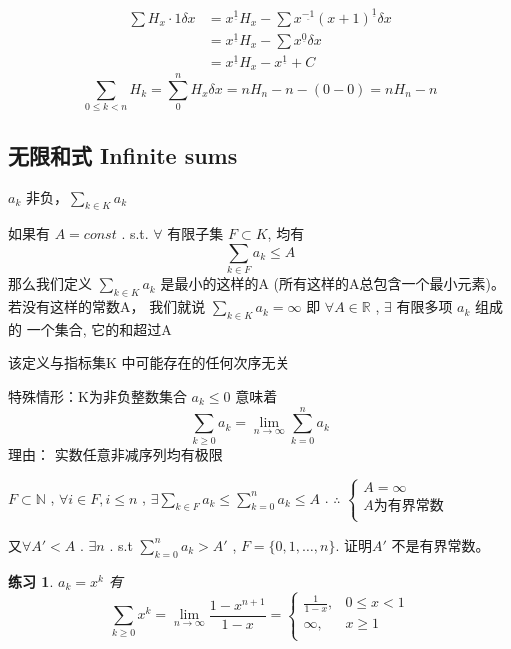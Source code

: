 \documentclass[mode=geye]{elegantnote}
\newtheorem{exercise}{练习}
\newcommand{\fallingfactorial}[1]{%
  ^{\underline{#1}}%
}
\begin{document}
\begin{align*}
    \sum H_x\cdot 1 \delta x
    &= x\fallingfactorial{1}H_x - \sum x\fallingfactorial{-1}(x+1)\fallingfactorial{1} \delta x\\
    &= x\fallingfactorial{1}H_x - \sum x\fallingfactorial{0}\delta x\\
    &= x\fallingfactorial{1}H_x - x\fallingfactorial{1} + C
\end{align*}
\begin{equation*}
    \sum_{0\leqslant k<n}H_k = \sum_{0}^{n}H_x\delta x = n H_n - n - (0-0) = n H_n - n
\end{equation*}

\subsection{无限和式 Infinite sums}
$ a_k $ 非负，$ \sum_{k\in K} a_k$ 
\begin{definition}
    如果有 $ A= const $ . s.t. $ \forall $ 有限⼦集 $ F\subset K $, 均有
    \begin{equation*}
        \sum_{k\in F}a_k \leqslant A
    \end{equation*}
    那么我们定义 $ \sum_{k\in K} a_k$ 是最小的这样的A
    (所有这样的A总包含⼀个最小元素)。
    若没有这样的常数A，
    我们就说 $ \sum_{k\in K} a_k = \infty $
    即
    $ \forall A\in \mathbb{R} $ , $ \exists $ 
    有限多项 $ a_k $ 组成的
    ⼀个集合, 它的和超过A
\end{definition}
该定义与指标集K 中可能存在的任何次序⽆关

特殊情形：K为非负整数集合
$ a_k \leqslant 0 $ 意味着
\begin{equation*}
    \sum_{k\geqslant 0} a_k = \lim_{n\rightarrow \infty}\sum_{k=0}^{n}a_k
\end{equation*}
理由： 实数任意非减序列均有极限

$  F \subset \mathbb{N} $ , $ \forall i\in F, i\leqslant n $ , $ \exists \sum_{k\in F}a_k \leqslant \sum_{k=0}^{n}a_k \leqslant A $ . \;
 $ \therefore $  $  \left\{\begin{array}{l}
    A=\infty\\
    A\text{为有界常数}\\
\end{array}\right. $ 

又$ \forall A' < A$ . $ \exists n $ . s.t $ \sum_{k=0}^{n}a_k > A' $ , $ F = \{0,1,\dots,n\} $. 证明$ A' $ 不是有界常数。

\begin{exercise}
    $ a_k = x^k $ 有
    \begin{equation*}
        \sum_{k\geqslant 0}x^k = \lim_{n\rightarrow\infty}\frac{1-x^{n+1}}{1-x} = \left\{\begin{array}{ll}
            \frac{1}{1-x}, & 0\leqslant x<1 \\
            \infty, & x\geqslant 1 \\
        \end{array}\right.
    \end{equation*}
\end{exercise}
\end{document}
